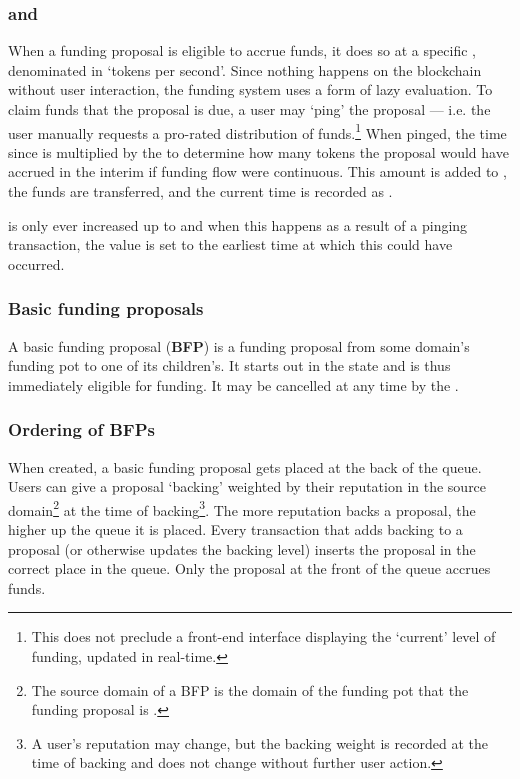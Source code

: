 \subsubsection*{ and }
When a funding proposal is eligible to accrue funds, it does so at a specific , denominated in `tokens per second'. Since nothing happens on the blockchain without user interaction, the funding system uses a form of lazy evaluation. To claim funds that the proposal is due, a user may `ping' the proposal --- i.e. the user manually requests a pro-rated distribution of funds.\footnote{This does not preclude a front-end interface displaying the `current' level of funding, updated in real-time.} When pinged, the time since  is multiplied by the  to determine how many tokens the proposal would have accrued in the interim if funding flow were continuous. This amount is added to , the funds are transferred, and the current time is recorded as .

 is only ever increased up to  and when this happens as a result of a pinging transaction, the  value is set to the earliest time at which this could have occurred.

\subsubsection{Basic funding proposals}
A basic funding proposal (\textbf{BFP}) is a funding proposal from some domain's funding pot to one of its children's. It starts out in the  state and is thus immediately eligible for funding. It may be cancelled at any time by the .

\subsubsection*{Ordering of BFPs}

When created, a basic funding proposal gets placed at the back of the queue. Users can give a proposal `backing' weighted by their reputation in the source domain\footnote{The source domain of a BFP is the domain of the funding pot that the funding proposal is .} at the time of backing\footnote{A user's reputation may change, but the backing weight is recorded at the time of backing and does not change without further user action.}. The more reputation backs a proposal, the higher up the queue it is placed. Every transaction that adds backing to a proposal (or otherwise updates the backing level) inserts the proposal in the correct place in the queue. Only the proposal at the front of the queue accrues funds.

